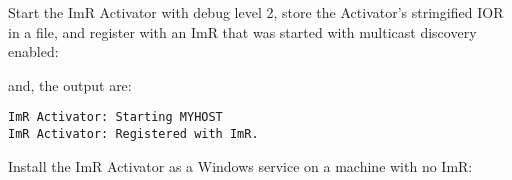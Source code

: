 Start the ImR Activator with debug level 2, store the Activator’s stringified IOR in a file, and register
with an ImR that was started with multicast discovery enabled:


and, the output are:

\begin{verbatim}
ImR Activator: Starting MYHOST
ImR Activator: Registered with ImR.
\end{verbatim}

Install the ImR Activator as a Windows service on a machine with no ImR:



